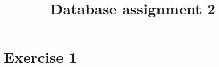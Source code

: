 \documentclass[10pt]{article}
\title{Database assignment 2}
\begin{document}
\maketitle

\section*{Exercise 1}
\end{document}
